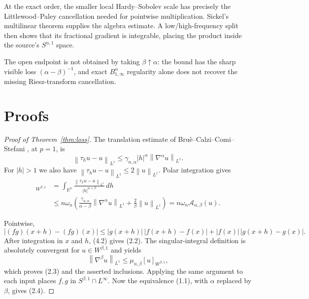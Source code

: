 \documentclass[11pt]{article}
\newcommand{\Rn}{\mathbb{R}^n}
\newcommand{\norm}[1]{\left\lVert #1\right\rVert}
\newcommand{\trans}{\tau}
\begin{document}
At the exact order, the smaller local Hardy--Sobolev scale has precisely the
Littlewood--Paley cancellation needed for pointwise multiplication.  Sickel's
multilinear theorem supplies the algebra estimate.  A low/high-frequency
split then shows that its fractional gradient is integrable, placing the
product inside the source's $S^{\alpha,1}$ space.

The open endpoint is not obtained by taking $\beta\uparrow\alpha$: the bound
has the sharp visible loss $(\alpha-\beta)^{-1}$, and exact
$B^\alpha_{1,\infty}$ regularity alone does not recover the missing
Riesz-transform cancellation.

\section{Proofs}

\begin{proof}[Proof of Theorem~\ref{thm:loss}]
The translation estimate of Bru\`e--Calzi--Comi--Stefani
\cite[Proposition~A.1]{BrueCalziComiStefani}, at $p=1$, is
\[
 \norm{\trans_hu-u}_{L^1}
 \le \gamma_{n,\alpha}|h|^\alpha
      \norm{\nabla^\alpha u}_{L^1}.                       \tag{4.1}
\]
For $|h|>1$ we also have
$\norm{\trans_hu-u}_{L^1}\le2\norm u_{L^1}$.  Polar integration gives
\begin{align*}
 [u]_{W^{\beta,1}}
 &=\int_{\Rn}\frac{\norm{\trans_hu-u}_{L^1}}
                         {|h|^{n+\beta}}\,dh\\
 &\le n\omega_n\left(
    \frac{\gamma_{n,\alpha}}{\alpha-\beta}
          \norm{\nabla^\alpha u}_{L^1}
   +\frac{2}{\beta}\norm u_{L^1}\right)
 =n\omega_n\mathcal A_{\alpha,\beta}(u).                 \tag{4.2}
\end{align*}

Pointwise,
\[
 |(fg)(x+h)-(fg)(x)|
 \le |g(x+h)|\,|f(x+h)-f(x)|
      +|f(x)|\,|g(x+h)-g(x)|.
\]
After integration in $x$ and $h$, (4.2) gives (2.2).  The singular-integral
definition is absolutely convergent for $u\in W^{\beta,1}$ and yields
\[
 \norm{\nabla^\beta u}_{L^1}
 \le\mu_{n,\beta}[u]_{W^{\beta,1}},                        \tag{4.3}
\]
which proves (2.3) and the asserted inclusions.  Applying the same argument
to each input places $f,g$ in $S^{\beta,1}\cap L^\infty$.  Now the equivalence
(1.1), with $\alpha$ replaced by $\beta$, gives (2.4).
\end{proof}
\end{document}
